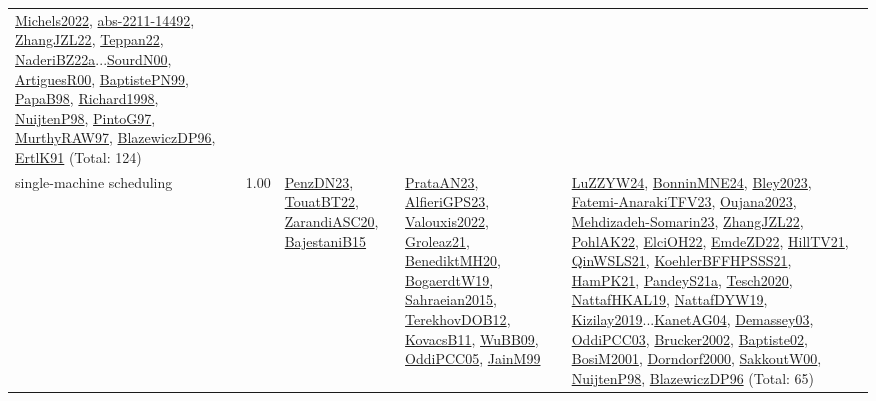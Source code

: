 {\begin{longtable}{p{3cm}r>{\raggedright\arraybackslash}p{6cm}>{\raggedright\arraybackslash}p{6cm}>{\raggedright\arraybackslash}p{8cm}}
\hyperref[detail:Michels2022]{Michels2022}, \hyperref[detail:abs-2211-14492]{abs-2211-14492}, \hyperref[detail:ZhangJZL22]{ZhangJZL22}, \hyperref[detail:Teppan22]{Teppan22}, \hyperref[detail:NaderiBZ22a]{NaderiBZ22a}...\hyperref[detail:SourdN00]{SourdN00}, \hyperref[detail:ArtiguesR00]{ArtiguesR00}, \hyperref[detail:BaptistePN99]{BaptistePN99}, \hyperref[detail:PapaB98]{PapaB98}, \hyperref[detail:Richard1998]{Richard1998}, \hyperref[detail:NuijtenP98]{NuijtenP98}, \hyperref[detail:PintoG97]{PintoG97}, \hyperref[detail:MurthyRAW97]{MurthyRAW97}, \hyperref[detail:BlazewiczDP96]{BlazewiczDP96}, \hyperref[detail:ErtlK91]{ErtlK91} (Total: 124)\\
\index{single-machine scheduling}\index{Concepts!single-machine scheduling}single-machine scheduling &  1.00 & \hyperref[detail:PenzDN23]{PenzDN23}, \hyperref[detail:TouatBT22]{TouatBT22}, \hyperref[detail:ZarandiASC20]{ZarandiASC20}, \hyperref[detail:BajestaniB15]{BajestaniB15} & \hyperref[detail:PrataAN23]{PrataAN23}, \hyperref[detail:AlfieriGPS23]{AlfieriGPS23}, \hyperref[detail:Valouxis2022]{Valouxis2022}, \hyperref[detail:Groleaz21]{Groleaz21}, \hyperref[detail:BenediktMH20]{BenediktMH20}, \hyperref[detail:BogaerdtW19]{BogaerdtW19}, \hyperref[detail:Sahraeian2015]{Sahraeian2015}, \hyperref[detail:TerekhovDOB12]{TerekhovDOB12}, \hyperref[detail:KovacsB11]{KovacsB11}, \hyperref[detail:WuBB09]{WuBB09}, \hyperref[detail:OddiPCC05]{OddiPCC05}, \hyperref[detail:JainM99]{JainM99} & \hyperref[detail:LuZZYW24]{LuZZYW24}, \hyperref[detail:BonninMNE24]{BonninMNE24}, \hyperref[detail:Bley2023]{Bley2023}, \hyperref[detail:Fatemi-AnarakiTFV23]{Fatemi-AnarakiTFV23}, \hyperref[detail:Oujana2023]{Oujana2023}, \hyperref[detail:Mehdizadeh-Somarin23]{Mehdizadeh-Somarin23}, \hyperref[detail:ZhangJZL22]{ZhangJZL22}, \hyperref[detail:PohlAK22]{PohlAK22}, \hyperref[detail:ElciOH22]{ElciOH22}, \hyperref[detail:EmdeZD22]{EmdeZD22}, \hyperref[detail:HillTV21]{HillTV21}, \hyperref[detail:QinWSLS21]{QinWSLS21}, \hyperref[detail:KoehlerBFFHPSSS21]{KoehlerBFFHPSSS21}, \hyperref[detail:HamPK21]{HamPK21}, \hyperref[detail:PandeyS21a]{PandeyS21a}, \hyperref[detail:Tesch2020]{Tesch2020}, \hyperref[detail:NattafHKAL19]{NattafHKAL19}, \hyperref[detail:NattafDYW19]{NattafDYW19}, \hyperref[detail:Kizilay2019]{Kizilay2019}...\hyperref[detail:KanetAG04]{KanetAG04}, \hyperref[detail:Demassey03]{Demassey03}, \hyperref[detail:OddiPCC03]{OddiPCC03}, \hyperref[detail:Brucker2002]{Brucker2002}, \hyperref[detail:Baptiste02]{Baptiste02}, \hyperref[detail:BosiM2001]{BosiM2001}, \hyperref[detail:Dorndorf2000]{Dorndorf2000}, \hyperref[detail:SakkoutW00]{SakkoutW00}, \hyperref[detail:NuijtenP98]{NuijtenP98}, \hyperref[detail:BlazewiczDP96]{BlazewiczDP96} (Total: 65)\\

\end{longtable}}
